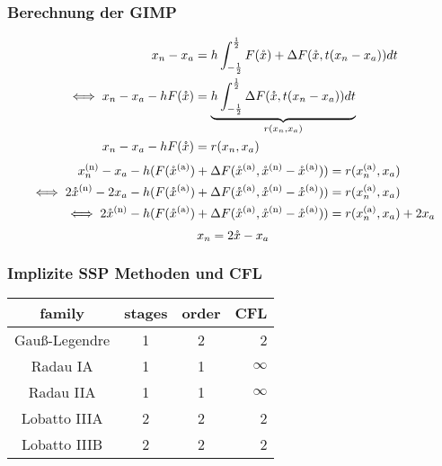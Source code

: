 \begin{frame}[<+->]
\frametitle{Berechnung der GIMP}
\begin{align}
x_n - x_a &= h \int_{-\frac{1}{2}}^{\frac{1}{2}} F(\mathring{x}) + \Delta F(\mathring{x},t(x_n-x_a))dt\\
\iff x_n - x_a -h F(\mathring{x})&= \underbrace{h \int_{-\frac{1}{2}}^{\frac{1}{2}} \Delta F(\mathring{x},t(x_n-x_a))dt}_{r(x_n,x_a)}\\
x_n - x_a -h F(\mathring{x}) &= r(x_n,x_a)
\end{align}
\begin{align}
  x_n^{\text{(n)}} - x_a - h (F(\mathring{x}^{\text{(a)}}) +\Delta F(\mathring{x}^{\text{(a)}},\mathring{x}^{\text{(n)}} - \mathring{x}^{\text{(a)}})) &= r(x_n^{\text{(a)}},x_a)\\
 \iff 2\mathring{x}^{\text{(n)}} - 2x_a - h (F(\mathring{x}^{\text{(a)}}) +\Delta F(\mathring{x}^{\text{(a)}},\mathring{x}^{\text{(n)}} - \mathring{x}^{\text{(a)}})) &= r(x_n^{\text{(a)}},x_a)\\
 \iff  2\mathring{x}^{\text{(n)}} -  h (F(\mathring{x}^{\text{(a)}}) +\Delta F(\mathring{x}^{\text{(a)}},\mathring{x}^{\text{(n)}} - \mathring{x}^{\text{(a)}})) &= r(x_n^{\text{(a)}},x_a) + 2x_a
\end{align}
\[x_n = 2\mathring{x} - x_a\]
\end{frame}

\begin{frame}
 \frametitle{Implizite SSP Methoden und CFL}
 \centering
\begin{tabular*}{0.75\textwidth}{  c | c | c | r  }
\hline 
family & stages & order & CFL \\ 
\hline 
Gauß-Legendre & 1 & 2 & 2 \\
\hline 
Radau IA& 1 & 1 & $\infty$ \\
\hline 
Radau IIA & 1 & 1 & $\infty$ \\
\hline 
Lobatto IIIA & 2 & 2 & 2 \\
\hline 
Lobatto IIIB & 2 & 2 & 2 \\
\hline 
\end{tabular*}
\end{frame}

